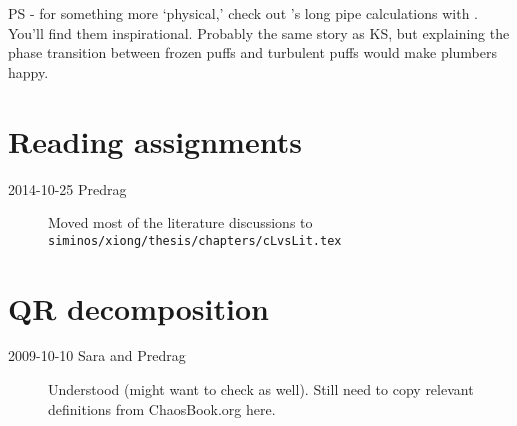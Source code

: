 PS - for something more `physical,' check out
's long pipe calculations with
.
You'll find them inspirational. Probably the same story as KS, but explaining the
phase transition between frozen puffs and turbulent puffs would make plumbers happy.

\section{Reading assignments}

\begin{description}
\item[2014-10-25 Predrag] Moved most of the literature discussions to
\\
\texttt{siminos/xiong/thesis/chapters/cLvsLit.tex}

\end{description}


\section{QR decomposition}
\label{QRdecomp}

\begin{description}
\item[2009-10-10 Sara and Predrag] Understood
     (might want to check
     as well). Still need to copy
    relevant definitions from ChaosBook.org here.
\end{description}

